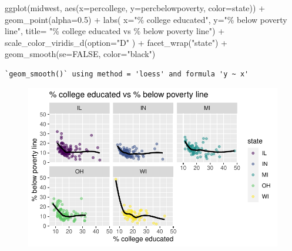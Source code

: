 \documentclass[
  letterpaper,
  DIV=11,
  numbers=noendperiod]{scrartcl}
\newenvironment{Shaded}{\begin{snugshade}}{\end{snugshade}}
\newcommand{\AttributeTok}[1]{\textcolor[rgb]{0.40,0.45,0.13}{#1}}
\newcommand{\ConstantTok}[1]{\textcolor[rgb]{0.56,0.35,0.01}{#1}}
\newcommand{\FloatTok}[1]{\textcolor[rgb]{0.68,0.00,0.00}{#1}}
\newcommand{\FunctionTok}[1]{\textcolor[rgb]{0.28,0.35,0.67}{#1}}
\newcommand{\NormalTok}[1]{\textcolor[rgb]{0.00,0.23,0.31}{#1}}
\newcommand{\SpecialCharTok}[1]{\textcolor[rgb]{0.37,0.37,0.37}{#1}}
\newcommand{\StringTok}[1]{\textcolor[rgb]{0.13,0.47,0.30}{#1}}
\begin{document}
\begin{Shaded}
\begin{Highlighting}[]
\FunctionTok{ggplot}\NormalTok{(midwest, }\FunctionTok{aes}\NormalTok{(}\AttributeTok{x=}\NormalTok{percollege, }\AttributeTok{y=}\NormalTok{percbelowpoverty, }\AttributeTok{color=}\NormalTok{state)) }\SpecialCharTok{+}
  \FunctionTok{geom\_point}\NormalTok{(}\AttributeTok{alpha=}\FloatTok{0.5}\NormalTok{) }\SpecialCharTok{+}
  \FunctionTok{labs}\NormalTok{( }\AttributeTok{x=}\StringTok{"\% college educated"}\NormalTok{,}
    \AttributeTok{y=}\StringTok{"\% below poverty line"}\NormalTok{,}
    \AttributeTok{title=} \StringTok{"\% college educated vs \% below poverty line"}\NormalTok{) }\SpecialCharTok{+}
  \FunctionTok{scale\_color\_viridis\_d}\NormalTok{(}\AttributeTok{option=}\StringTok{"D"}\NormalTok{ ) }\SpecialCharTok{+}
  \FunctionTok{facet\_wrap}\NormalTok{(}\StringTok{"state"}\NormalTok{) }\SpecialCharTok{+}
  \FunctionTok{geom\_smooth}\NormalTok{(}\AttributeTok{se=}\ConstantTok{FALSE}\NormalTok{, }\AttributeTok{color=}\StringTok{"black"}\NormalTok{)}
\end{Highlighting}
\end{Shaded}

\begin{verbatim}
`geom_smooth()` using method = 'loess' and formula 'y ~ x'
\end{verbatim}

\begin{figure}[H]

{\centering \includegraphics{lab-1_files/figure-pdf/separate-scatter-for-each-state-1.pdf}

}

\end{figure}
\end{document}
